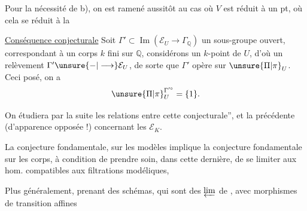 Pour la nécessité de b), on est ramené aussitôt au cas où $V$ est réduit à un pt, où cela se réduit à la 

\uline{Conséquence conjecturale} Soit $\Gamma'\subset\operatorname{Im}(\mathcal E_U\longrightarrow\Gamma_{\mathbb{Q}})$ un sous-groupe ouvert, correspondant à un corps $k$ fini sur $\mathbb{Q}$, considérons un $k$-point de $U$, d'où un relèvement $\Gamma'\unsure{-|\longrightarrow}\mathcal E_U$, de sorte que $\Gamma'$ opère sur $\unsure{\Pi|\pi}_U$. Ceci posé, on a
\[
\unsure{\Pi|\pi}_U^{\Gamma'^\circ}=\{1\}.
\]

On étudiera par la suite les relations entre cette  conjecturale'', et la précédente (d'apparence opposée !) concernant les $\mathcal E_K$.

La conjecture fondamentale, sur les modèles implique la conjecture fondamentale sur les corps, à condition de prendre soin, dans cette dernière, de se limiter aux hom. compatibles aux filtrations modéliques,

Plus généralement, prenant  des schémas,  qui sont des $\varprojlim$ de   , avec morphismes de transition  affines
